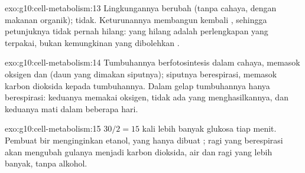 \begin{solution}{exo:g10:cell-metabolism:13}
Lingkungannya berubah (tanpa cahaya, dengan makanan organik); 
tidak. Keturunannya membangun kembali , sehingga
petunjuknya tidak pernah hilang: yang hilang adalah perlengkapan yang
terpakai, bukan kemungkinan yang dibolehkan .
\end{solution}

\begin{solution}{exo:g10:cell-metabolism:14}
Tumbuhannya berfotosintesis dalam cahaya, memasok oksigen dan  (daun yang dimakan siputnya); siputnya berespirasi, memasok
karbon dioksida kepada tumbuhannya. Dalam gelap tumbuhannya hanya
berespirasi: keduanya memakai oksigen, tidak ada yang menghasilkannya,
dan keduanya mati dalam beberapa hari.
\end{solution}

\begin{solution}{exo:g10:cell-metabolism:15}
$30/2 = 15$ kali lebih banyak glukosa tiap menit. Pembuat bir
menginginkan etanol, yang hanya dibuat ; ragi yang
berespirasi akan mengubah gulanya menjadi karbon dioksida, air dan ragi
yang lebih banyak, tanpa alkohol.
\end{solution}

